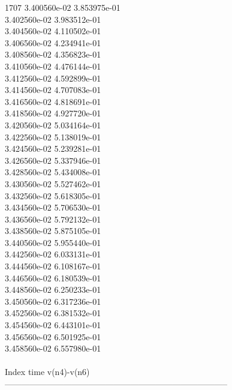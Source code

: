 1707	3.400560e-02	3.853975e-01	\\ 	3.402560e-02	3.983512e-01	\\ 	3.404560e-02	4.110502e-01	\\ 	3.406560e-02	4.234941e-01	\\ 	3.408560e-02	4.356823e-01	\\ 	3.410560e-02	4.476144e-01	\\ 	3.412560e-02	4.592899e-01	\\ 	3.414560e-02	4.707083e-01	\\ 	3.416560e-02	4.818691e-01	\\ 	3.418560e-02	4.927720e-01	\\ 	3.420560e-02	5.034164e-01	\\ 	3.422560e-02	5.138019e-01	\\ 	3.424560e-02	5.239281e-01	\\ 	3.426560e-02	5.337946e-01	\\ 	3.428560e-02	5.434008e-01	\\ 	3.430560e-02	5.527462e-01	\\ 	3.432560e-02	5.618305e-01	\\ 	3.434560e-02	5.706530e-01	\\ 	3.436560e-02	5.792132e-01	\\ 	3.438560e-02	5.875105e-01	\\ 	3.440560e-02	5.955440e-01	\\ 	3.442560e-02	6.033131e-01	\\ 	3.444560e-02	6.108167e-01	\\ 	3.446560e-02	6.180539e-01	\\ 	3.448560e-02	6.250233e-01	\\ 	3.450560e-02	6.317236e-01	\\ 	3.452560e-02	6.381532e-01	\\ 	3.454560e-02	6.443101e-01	\\ 	3.456560e-02	6.501925e-01	\\ 	3.458560e-02	6.557980e-01	\\ \hline
\\ \hline
Index   time            v(n4)-v(n6)     \\ \hline
--------------------------------------------------------------------------------\\ \hline
